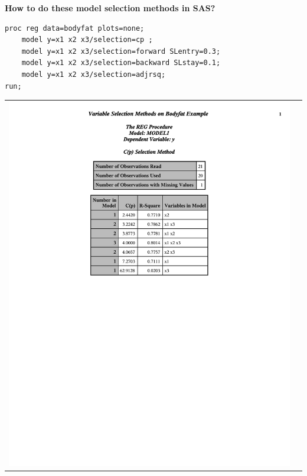 \documentclass{article}
\begin{document}
\textbf{How to do these model selection methods in SAS?}\\
\begin{small}
\begin{verbatim}
proc reg data=bodyfat plots=none;
    model y=x1 x2 x3/selection=cp ;
    model y=x1 x2 x3/selection=forward SLentry=0.3;
    model y=x1 x2 x3/selection=backward SLstay=0.1;
  	model y=x1 x2 x3/selection=adjrsq;
run;
\end{verbatim}
\end{small}

\begin{center}
\begin{tabular}{cc}
\includegraphics[page=1,scale=0.6,trim=40mm 30mm 20mm 10mm]{bodyfatexampleselection}&

\end{tabular}
\end{center}
\end{document}
